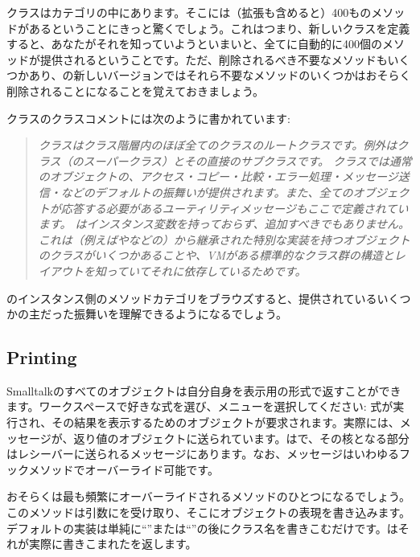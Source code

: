 \documentclass[a4paper,10pt,twoside]{book}
\begin{document}
クラスはカテゴリの中にあります。そこには（拡張も含めると）400ものメソッドがあるということにきっと驚くでしょう。これはつまり、新しいクラスを定義すると、あなたがそれを知っていようといまいと、全てに自動的に400個のメソッドが提供されるということです。ただ、削除されるべき不要なメソッドもいくつかあり、\pharo の新しいバージョンではそれら不要なメソッドのいくつかはおそらく削除されることになることを覚えておきましょう。

クラスのクラスコメントには次のように書かれています:

\begin{quote}
\textit{クラスはクラス階層内のほぼ全てのクラスのルートクラスです。例外はクラス（のスーパークラス）とその直接のサブクラスです。
クラスでは通常のオブジェクトの、アクセス・コピー・比較・エラー処理・メッセージ送信・などのデフォルトの振舞いが提供されます。また、全てのオブジェクトが応答する必要があるユーティリティメッセージもここで定義されています。
はインスタンス変数を持っておらず、追加すべきでもありません。これは（例えばやなどの）から継承された特別な実装を持つオブジェクトのクラスがいくつかあることや、VMがある標準的なクラス群の構造とレイアウトを知っていてそれに依存しているためです。
}
\end{quote}

のインスタンス側のメソッドカテゴリをブラウズすると、提供されているいくつかの主だった振舞いを理解できるようになるでしょう。

\subsection{Printing}
Smalltalkのすべてのオブジェクトは自分自身を表示用の形式で返すことができます。ワークスペースで好きな式を選び、メニューを選択してください: 式が実行され、その結果を表示するためのオブジェクトが要求されます。実際には、メッセージが、返り値のオブジェクトに送られています。はで、その核となる部分はレシーバーに送られるメッセージにあります。なお、メッセージはいわゆるフックメソッドでオーバーライド可能です。

おそらくは最も頻繁にオーバーライドされるメソッドのひとつになるでしょう。このメソッドは引数にを受け取り、そこにオブジェクトの表現を書き込みます。デフォルトの実装は単純に``''または``''の後にクラス名を書きこむだけです。はそれが実際に書きこまれたを返します。
\end{document}
